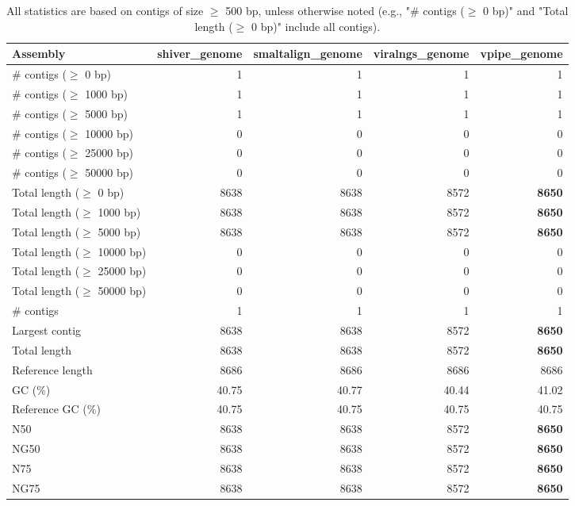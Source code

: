 \documentclass[12pt,a4paper]{article}
\begin{document}
\begin{table}[ht]
\begin{center}
\caption{All statistics are based on contigs of size $\geq$ 500 bp, unless otherwise noted (e.g., "\# contigs ($\geq$ 0 bp)" and "Total length ($\geq$ 0 bp)" include all contigs).}
\begin{tabular}{|l*{4}{|r}|}
\hline
Assembly & shiver\_genome & smaltalign\_genome & viralngs\_genome & vpipe\_genome \\ \hline
\# contigs ($\geq$ 0 bp) & 1 & 1 & 1 & 1 \\ \hline
\# contigs ($\geq$ 1000 bp) & 1 & 1 & 1 & 1 \\ \hline
\# contigs ($\geq$ 5000 bp) & 1 & 1 & 1 & 1 \\ \hline
\# contigs ($\geq$ 10000 bp) & 0 & 0 & 0 & 0 \\ \hline
\# contigs ($\geq$ 25000 bp) & 0 & 0 & 0 & 0 \\ \hline
\# contigs ($\geq$ 50000 bp) & 0 & 0 & 0 & 0 \\ \hline
Total length ($\geq$ 0 bp) & 8638 & 8638 & 8572 & {\bf 8650} \\ \hline
Total length ($\geq$ 1000 bp) & 8638 & 8638 & 8572 & {\bf 8650} \\ \hline
Total length ($\geq$ 5000 bp) & 8638 & 8638 & 8572 & {\bf 8650} \\ \hline
Total length ($\geq$ 10000 bp) & 0 & 0 & 0 & 0 \\ \hline
Total length ($\geq$ 25000 bp) & 0 & 0 & 0 & 0 \\ \hline
Total length ($\geq$ 50000 bp) & 0 & 0 & 0 & 0 \\ \hline
\# contigs & 1 & 1 & 1 & 1 \\ \hline
Largest contig & 8638 & 8638 & 8572 & {\bf 8650} \\ \hline
Total length & 8638 & 8638 & 8572 & {\bf 8650} \\ \hline
Reference length & 8686 & 8686 & 8686 & 8686 \\ \hline
GC (\%) & 40.75 & 40.77 & 40.44 & 41.02 \\ \hline
Reference GC (\%) & 40.75 & 40.75 & 40.75 & 40.75 \\ \hline
N50 & 8638 & 8638 & 8572 & {\bf 8650} \\ \hline
NG50 & 8638 & 8638 & 8572 & {\bf 8650} \\ \hline
N75 & 8638 & 8638 & 8572 & {\bf 8650} \\ \hline
NG75 & 8638 & 8638 & 8572 & {\bf 8650} \\ \hline

\end{tabular}
\end{center}
\end{table}
\end{document}
